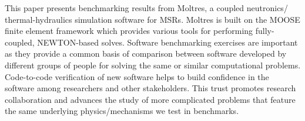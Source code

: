 This paper presents benchmarking results from Moltres, a coupled
neutronics/ thermal-hydraulics simulation software for \glspl{MSR}. Moltres is
built on the \gls{MOOSE} \citep{gaston_physics-based_2015} finite element
framework which provides various tools for performing fully-coupled,
NEWTON-based solves. Software benchmarking exercises are important as they
provide a common basis of comparison between software developed by different
groups of people for solving the same or similar computational problems.
Code-to-code verification of new software helps to build confidence in the
software among researchers and other stakeholders. This trust promotes
research collaboration and advances the study of more complicated problems that
feature the same underlying physics/mechanisms we test in benchmarks.
